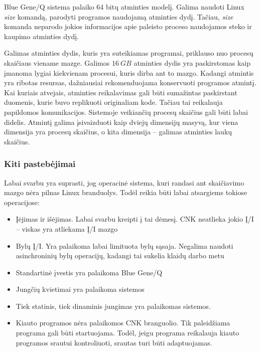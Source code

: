 Blue Gene/Q sistema palaiko 64 bitų atminties modelį.
Galima naudoti Linux \textit{size} komandą, parodyti programos naudojamą atminties dydį.
Tačiau, \textit{size} komanda neparodo jokios informacijos apie paleisto proceso naudojamos steko ir kaupimo  atminties dydį.

Galimas atminties dydis, kuris yra suteikiamas programai, priklauso nuo procesų skaičiaus viename mazge.
Galimos $16~GB$ atminties dydis yra paskirstomas kaip įmanoma lygiai kiekvienam procesui, kuris dirba ant to mazgo.
Kadangi atmintis yra ribotas resursas, dažniausiai rekomenduojama konservuoti programos atmintį.
Kai kuriais atvejais, atminties reikalavimas gali būti sumažintas paskirstant duomenis, kurie buvo replikuoti originaliam kode.
Tačiau tai reikalauja papildomos komunikacijos.
Sistemoje veikiančių procesų skaičius gali būti labai didelis.
Atmintį galima įsivaizduoti kaip dviejų dimensijų masyvą, kur viena dimensija yra procesų skaičius, o kita dimensija -- galimas atminties laukų skaičius.

\subsubsection{Kiti pastebėjimai}

Labai svarbu yra suprasti, jog operacinė sistema, kuri randasi ant skaičiavimo mazgo nėra pilnas Linux branduolys.
Todėl reikia būti labai atsargiems tokiose operacijose:

\begin{itemize}
    \item Įėjimas ir išėjimas. Labai svarbu kreipti į tai dėmesį. CNK neatlieka jokio Į/I -- viskas yra atliekama Į/I mazgo
    \item Bylų Į/I. Yra palaikoma labai limituota bylų sąsaja. Negalima naudoti asinchroninių bylų operacijų, kadangi tai sukelia klaidų darbo metu
    \item Standartinė įvestis yra palaikoma Blue Gene/Q
    \item Jungčių kvietimai yra palaikoma sistemos
    \item Tiek statinis, tiek dinaminis jungimas yra palaikomas sistemos.
    \item Kiauto programos nėra palaikomos CNK branguolio. Tik paleidžiama programa gali būti startuojama.
    Todėl, jeigu programa reikalauja kiauto programos srautui kontroliuoti, srautas turi būti adaptuojamas.
\end{itemize}
